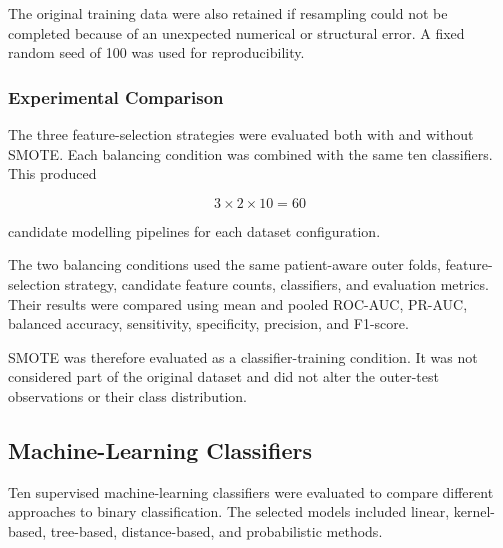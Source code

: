 \documentclass[12pt,twocolumn]{article}
\begin{document}
The original training data were also retained if resampling could not
be completed because of an unexpected numerical or structural error.
A fixed random seed of 100 was used for reproducibility.





\subsubsection{Experimental Comparison}
\label{subsubsec:smote_comparison_design}

The three feature-selection strategies were evaluated both with and
without SMOTE. Each balancing condition was combined with the same ten
classifiers. This produced

\begin{equation}
3
\times
2
\times
10
=
60
\label{eq:smote_experimental_grid}
\end{equation}

candidate modelling pipelines for each dataset configuration.

The two balancing conditions used the same patient-aware outer folds,
feature-selection strategy, candidate feature counts, classifiers, and
evaluation metrics. Their results were compared using mean and pooled
ROC-AUC, PR-AUC, balanced accuracy, sensitivity, specificity,
precision, and F1-score.

SMOTE was therefore evaluated as a classifier-training condition. It
was not considered part of the original dataset and did not alter the
outer-test observations or their class distribution.





















\subsection{Machine-Learning Classifiers}
\label{subsec:classifiers}

Ten supervised machine-learning classifiers were evaluated to compare
different approaches to binary classification. The selected models
included linear, kernel-based, tree-based, distance-based, and
probabilistic methods.
\end{document}
